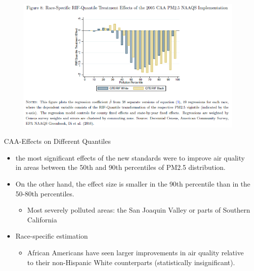 \documentclass[dvipdfmx,12pt]{beamer}
\begin{document}
\begin{frame}{}
  \begin{figure}
    \centering
    \includegraphics[scale = .65]{F8.png}
  \end{figure}
\end{frame}

\begin{frame}{CAA-Effects on Different Quantiles}
  \begin{itemize}
    \item the most significant effects of the new standards were to improve air quality in areas between the 50th and 90th percentiles of PM2.5 distribution.
    \item On the other hand, the effect size is smaller in the 90th percentile than in the 50-80th percentiles.
    \begin{itemize}
      \item Most severely polluted areas: the San Joaquin Valley or parts of Southern California
    \end{itemize}
    \item Race-specific estimation
    \begin{itemize}
      \item African Americans have seen larger improvements in air quality relative to their non-Hispanic White counterparts (statistically insignificant).
    \end{itemize}
  \end{itemize}
\end{frame}
\end{document}

